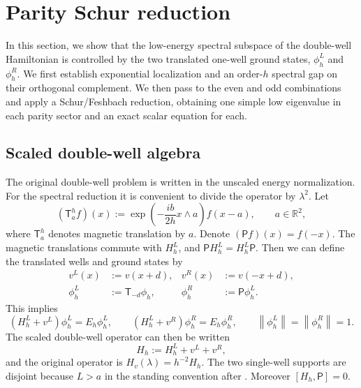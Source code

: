 \documentclass[11pt]{article}
\newcommand{\R}{\mathbb R}
\newcommand{\norm}[1]{\left\|#1\right\|}
\newcommand{\wedgep}{\mathbin{\wedge}}
\begin{document}
\section{Parity Schur reduction}\label{sec:schur-reduction}
In this section, we show that the low-energy spectral subspace of the double-well Hamiltonian is controlled by the two translated one-well ground states, $\phi_h^L$ and $\phi_h^R$. We first establish exponential localization and an order-$h$ spectral gap on their orthogonal complement. We then pass to the even and odd combinations and apply a Schur/Feshbach reduction, obtaining one simple low eigenvalue in each parity sector and an exact scalar equation for each.

\subsection{Scaled double-well algebra}\label{sec:scaled-double-well}
The original double-well problem is written in the unscaled energy normalization.  For the
spectral reduction it is convenient to divide the operator by $\lambda^2$.  Let
\begin{equation}\label{eq:magnetic-translation}
 (\mathsf T_a^h f)(x)
 :=\exp\!\left(-\frac{ib}{2h}x\wedgep a\right)f(x-a),
 \qquad a\in\R^2,
\end{equation}
where $\mathsf T_a^h$ denotes magnetic translation by $a$. Denote $(\mathsf Pf)(x)=f(-x)$.  The magnetic translations commute with $H_h^L$,
and $\mathsf P H_h^L=H_h^L\mathsf P$.  Then we can define the translated wells and ground states by
\begin{align}
 v^L(x)&:=v(x+d),& v^R(x)&:=v(-x+d),\label{eq:translated-potentials}\\
 \phi_h^L&:=\mathsf T_{-d}\phi_h,&
 \phi_h^R&:=\mathsf P\phi_h^L.\label{eq:translated-states}
\end{align}
This implies
\begin{equation}\label{eq:one-well-equations}
 (H_h^L+v^L)\phi_h^L=E_h\phi_h^L,
 \qquad
 (H_h^L+v^R)\phi_h^R=E_h\phi_h^R,
 \qquad
 \norm{\phi_h^L}=\norm{\phi_h^R}=1.
\end{equation}
The scaled double-well operator can then be written
\begin{equation}\label{eq:Hh}
 H_h:=H_h^L+v^L+v^R,
\end{equation}
and the original operator is $H_v(\lambda)=h^{-2}H_h$.  The two single-well supports are disjoint because $L>a$ in the standing convention after .
Moreover $[H_h,\mathsf P]=0$.
\end{document}
